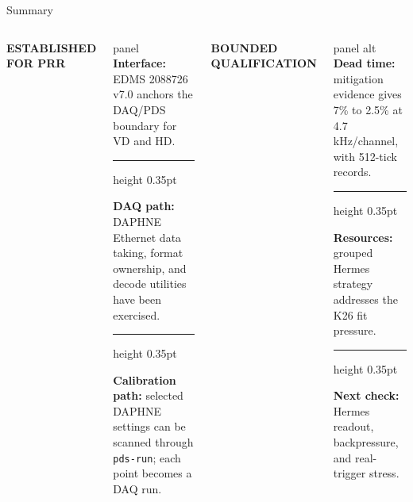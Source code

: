 \documentclass[aspectratio=169,10pt]{beamer}
\newcommand{\eyebrow}[1]{{\color{noircyan}\small\bfseries #1\par}}
\newcommand{\blocksep}{%
  \vspace{0.7mm}%
  {\color{noirline}\hrule height 0.35pt}%
  \vspace{0.7mm}%
}
\begin{document}
\begin{frame}[t]{Summary}
\vspace{1mm}
\begin{columns}[T,onlytextwidth]
\eyebrow{ESTABLISHED FOR PRR}
\vspace{0.8mm}
\begin{beamercolorbox}[wd=\linewidth,sep=6pt,rounded=true]{panel}
\small
\textbf{Interface:} EDMS 2088726 v7.0 anchors the DAQ/PDS boundary for VD and HD.
\blocksep
\textbf{DAQ path:} DAPHNE Ethernet data taking, format ownership, and decode utilities have been exercised.
\blocksep
\textbf{Calibration path:} selected DAPHNE settings can be scanned through \texttt{pds-run}; each point becomes a DAQ run.
\end{beamercolorbox}

\eyebrow{BOUNDED QUALIFICATION}
\vspace{0.8mm}
\begin{beamercolorbox}[wd=\linewidth,sep=6pt,rounded=true]{panel alt}
\small
\textbf{Dead time:} mitigation evidence gives 7\% to 2.5\% at 4.7 kHz/channel, with 512-tick records.
\blocksep
\textbf{Resources:} grouped Hermes strategy addresses the K26 fit pressure.
\blocksep
\textbf{Next check:} Hermes readout, backpressure, and real-trigger stress.
\end{beamercolorbox}
\end{columns}
\end{frame}
\end{document}
